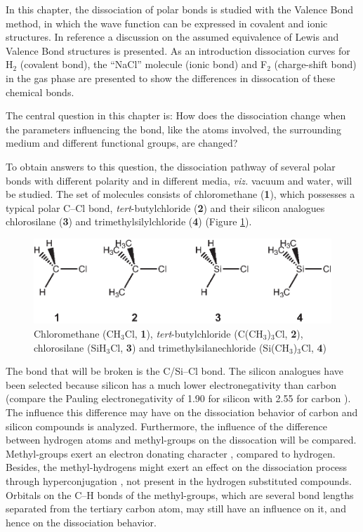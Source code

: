 In this chapter, the dissociation of polar bonds is studied with the Valence Bond method, in which the wave function can be expressed in covalent and ionic structures. In reference \cite{interpret} a discussion on the assumed equivalence of Lewis and Valence Bond structures is presented. As an introduction dissociation curves for H$_2$ (covalent bond), the ``NaCl'' molecule (ionic bond) and F$_2$ (charge-shift bond) in the gas phase are presented to show the differences in dissocation of these chemical bonds.

The central question in this chapter is: How does the dissociation change when the parameters influencing the bond, like the atoms involved, the surrounding medium and different functional groups, are changed?

To obtain answers to this question, the dissociation pathway of several polar bonds with different polarity and in different media, \textit{viz.} vacuum and water, will be studied.  The set of molecules consists of chloromethane (\textbf{1}), which possesses a typical polar C--Cl bond, \textit{tert}-butylchloride (\textbf{2}) and their silicon analogues chlorosilane (\textbf{3}) and trimethylsilylchloride (\textbf{4}) (Figure \ref{ch3.fig.compounds}).  
\begin{figure}[htbp]
\begin{center}
\includegraphics{dissociation/figures/compounds.eps}
\end{center}
\caption{Chloromethane (CH$_3$Cl, \textbf{1}), \textit{tert}-butylchloride
(C(CH$_3$)$_3$Cl, \textbf{2}), chlorosilane (SiH$_3$Cl, \textbf{3}) and trimethylsilanechloride
(Si(CH$_3$)$_3$Cl, \textbf{4})}
\label{ch3.fig.compounds}
\end{figure} 
The bond that will be broken is the C/Si--Cl bond. The silicon analogues have been selected because silicon has a much lower electronegativity than carbon (compare the Pauling electronegativity of 1.90 for silicon with 2.55 for carbon \cite{handbook}). The influence this difference may have on the dissociation behavior of carbon and silicon compounds is analyzed. Furthermore, the influence of the difference between hydrogen atoms and methyl-groups on the dissocation will be compared. Methyl-groups exert an electron donating character \cite{mcmurry}, compared to hydrogen. Besides, the methyl-hydrogens might exert an effect on the dissociation process through hyperconjugation \cite{march}, not present in the hydrogen substituted compounds. Orbitals on the C--H bonds of the methyl-groups, which are several bond lengths separated from the tertiary carbon atom, may still have an influence on it, and hence on the dissociation behavior. 

